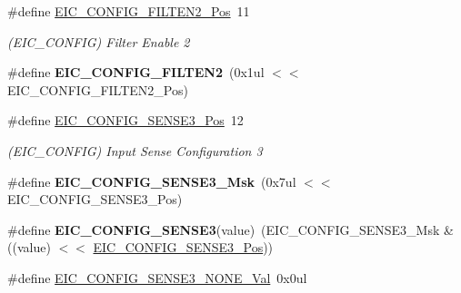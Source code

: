 \begin{DoxyCompactItemize}
\item 
\hypertarget{group___s_a_m_l21___e_i_c_ga54e72c526cf4c31edf453b7f50618043}{}\#define \hyperlink{group___s_a_m_l21___e_i_c_ga54e72c526cf4c31edf453b7f50618043}{E\+I\+C\+\_\+\+C\+O\+N\+F\+I\+G\+\_\+\+F\+I\+L\+T\+E\+N2\+\_\+\+Pos}~11\label{group___s_a_m_l21___e_i_c_ga54e72c526cf4c31edf453b7f50618043}

\begin{DoxyCompactList}\small\item\em (E\+I\+C\+\_\+\+C\+O\+N\+F\+I\+G) Filter Enable 2 \end{DoxyCompactList}\item 
\hypertarget{group___s_a_m_l21___e_i_c_ga30d78ba0b6725cd2a5bdb971430773fb}{}\#define {\bfseries E\+I\+C\+\_\+\+C\+O\+N\+F\+I\+G\+\_\+\+F\+I\+L\+T\+E\+N2}~(0x1ul $<$$<$ E\+I\+C\+\_\+\+C\+O\+N\+F\+I\+G\+\_\+\+F\+I\+L\+T\+E\+N2\+\_\+\+Pos)\label{group___s_a_m_l21___e_i_c_ga30d78ba0b6725cd2a5bdb971430773fb}

\item 
\hypertarget{group___s_a_m_l21___e_i_c_ga831aeaf54a89c732e999bddee6ad0cbf}{}\#define \hyperlink{group___s_a_m_l21___e_i_c_ga831aeaf54a89c732e999bddee6ad0cbf}{E\+I\+C\+\_\+\+C\+O\+N\+F\+I\+G\+\_\+\+S\+E\+N\+S\+E3\+\_\+\+Pos}~12\label{group___s_a_m_l21___e_i_c_ga831aeaf54a89c732e999bddee6ad0cbf}

\begin{DoxyCompactList}\small\item\em (E\+I\+C\+\_\+\+C\+O\+N\+F\+I\+G) Input Sense Configuration 3 \end{DoxyCompactList}\item 
\hypertarget{group___s_a_m_l21___e_i_c_ga098cccccbc01e4565d38bcd6426fb6ff}{}\#define {\bfseries E\+I\+C\+\_\+\+C\+O\+N\+F\+I\+G\+\_\+\+S\+E\+N\+S\+E3\+\_\+\+Msk}~(0x7ul $<$$<$ E\+I\+C\+\_\+\+C\+O\+N\+F\+I\+G\+\_\+\+S\+E\+N\+S\+E3\+\_\+\+Pos)\label{group___s_a_m_l21___e_i_c_ga098cccccbc01e4565d38bcd6426fb6ff}

\item 
\hypertarget{group___s_a_m_l21___e_i_c_gaa690400bd1b29ec479f6fac590b96a4d}{}\#define {\bfseries E\+I\+C\+\_\+\+C\+O\+N\+F\+I\+G\+\_\+\+S\+E\+N\+S\+E3}(value)~(E\+I\+C\+\_\+\+C\+O\+N\+F\+I\+G\+\_\+\+S\+E\+N\+S\+E3\+\_\+\+Msk \& ((value) $<$$<$ \hyperlink{group___s_a_m_l21___e_i_c_ga831aeaf54a89c732e999bddee6ad0cbf}{E\+I\+C\+\_\+\+C\+O\+N\+F\+I\+G\+\_\+\+S\+E\+N\+S\+E3\+\_\+\+Pos}))\label{group___s_a_m_l21___e_i_c_gaa690400bd1b29ec479f6fac590b96a4d}

\item 
\hypertarget{group___s_a_m_l21___e_i_c_gae6cb4f8bb0afd3fd2c89dad8d552ec1f}{}\#define \hyperlink{group___s_a_m_l21___e_i_c_gae6cb4f8bb0afd3fd2c89dad8d552ec1f}{E\+I\+C\+\_\+\+C\+O\+N\+F\+I\+G\+\_\+\+S\+E\+N\+S\+E3\+\_\+\+N\+O\+N\+E\+\_\+\+Val}~0x0ul\label{group___s_a_m_l21___e_i_c_gae6cb4f8bb0afd3fd2c89dad8d552ec1f}


\end{DoxyCompactItemize}
